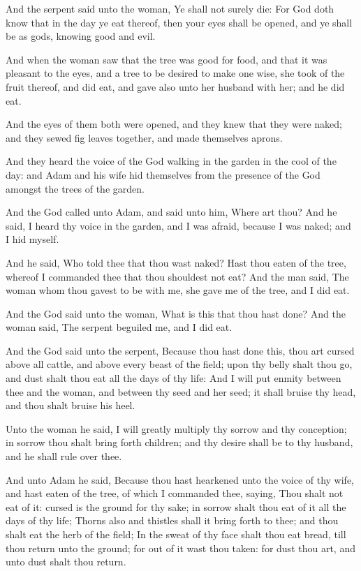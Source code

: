 \verse And the serpent said unto the woman, Ye shall not surely die: \verse
For God doth know that in the day ye eat thereof, then your eyes shall
be opened, and ye shall be as gods, knowing good and evil.

\verse And when the woman saw that the tree was good for food, and that
it was pleasant to the eyes, and a tree to be desired to make one
wise, she took of the fruit thereof, and did eat, and gave also unto
her husband with her; and he did eat.

\verse And the eyes of them both were opened, and they knew that they
were naked; and they sewed fig leaves together, and made themselves
aprons.

\verse And they heard the voice of the \LORD God walking in the garden in
the cool of the day: and Adam and his wife hid themselves from the
presence of the \LORD God amongst the trees of the garden.

\verse And the \LORD God called unto Adam, and said unto him, Where art
thou?  \verse And he said, I heard thy voice in the garden, and I was
afraid, because I was naked; and I hid myself.

\verse And he said, Who told thee that thou wast naked? Hast thou eaten
of the tree, whereof I commanded thee that thou shouldest not eat?
\verse And the man said, The woman whom thou gavest to be with me, she
gave me of the tree, and I did eat.

\verse And the \LORD God said unto the woman, What is this that thou hast
done? And the woman said, The serpent beguiled me, and I did eat.

\verse And the \LORD God said unto the serpent, Because thou hast done
this, thou art cursed above all cattle, and above every beast of the
field; upon thy belly shalt thou go, and dust shalt thou eat all the
days of thy life: \verse And I will put enmity between thee and the
woman, and between thy seed and her seed; it shall bruise thy head,
and thou shalt bruise his heel.

\verse Unto the woman he said, I will greatly multiply thy sorrow and
thy conception; in sorrow thou shalt bring forth children; and thy
desire shall be to thy husband, and he shall rule over thee.

\verse And unto Adam he said, Because thou hast hearkened unto the voice
of thy wife, and hast eaten of the tree, of which I commanded thee,
saying, Thou shalt not eat of it: cursed is the ground for thy sake;
in sorrow shalt thou eat of it all the days of thy life; \verse Thorns
also and thistles shall it bring forth to thee; and thou shalt eat the
herb of the field; \verse In the sweat of thy face shalt thou eat bread,
till thou return unto the ground; for out of it wast thou taken: for
dust thou art, and unto dust shalt thou return.

